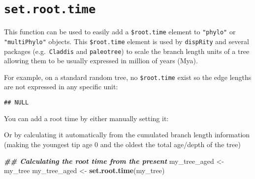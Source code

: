 \documentclass[
]{book}
\newenvironment{Shaded}{\begin{snugshade}}{\end{snugshade}}
\newcommand{\CommentTok}[1]{\textcolor[rgb]{0.56,0.35,0.01}{\textit{#1}}}
\newcommand{\DecValTok}[1]{\textcolor[rgb]{0.00,0.00,0.81}{#1}}
\newcommand{\DocumentationTok}[1]{\textcolor[rgb]{0.56,0.35,0.01}{\textbf{\textit{#1}}}}
\newcommand{\FunctionTok}[1]{\textcolor[rgb]{0.13,0.29,0.53}{\textbf{#1}}}
\newcommand{\NormalTok}[1]{#1}
\newcommand{\OtherTok}[1]{\textcolor[rgb]{0.56,0.35,0.01}{#1}}
\newcommand{\SpecialCharTok}[1]{\textcolor[rgb]{0.81,0.36,0.00}{\textbf{#1}}}
\begin{document}
\hypertarget{set.root.time}{%
\section{\texorpdfstring{\texttt{set.root.time}}{set.root.time}}\label{set.root.time}}

This function can be used to easily add a \texttt{\$root.time} element to \texttt{"phylo"} or \texttt{"multiPhylo"} objects.
This \texttt{\$root.time} element is used by \texttt{dispRity} and several packages (e.g.~\texttt{Claddis} and \texttt{paleotree}) to scale the branch length units of a tree allowing them to be usually expressed in million of years (Mya).

For example, on a standard random tree, no \texttt{\$root.time} exist so the edge lengths are not expressed in any specific unit:

\begin{Shaded}
\end{Shaded}

\begin{verbatim}
## NULL
\end{verbatim}

You can add a root time by either manually setting it:

\begin{Shaded}
\end{Shaded}

Or by calculating it automatically from the cumulated branch length information (making the youngest tip age 0 and the oldest the total age/depth of the tree)

\begin{Shaded}
\begin{Highlighting}[]
\DocumentationTok{\#\# Calculating the root time from the present}
\NormalTok{my\_tree\_aged }\OtherTok{\textless{}{-}}\NormalTok{ my\_tree }
\NormalTok{my\_tree\_aged }\OtherTok{\textless{}{-}} \FunctionTok{set.root.time}\NormalTok{(my\_tree)}
\end{Highlighting}
\end{Shaded}
\end{document}
